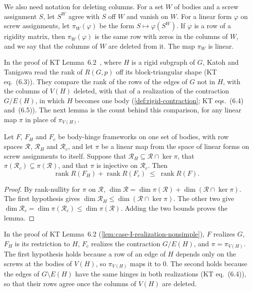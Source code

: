 We also need notation for deleting columns. For a set $W$ of bodies and
a screw assignment $S$, let $S^W$ agree with $S$ off $W$ and vanish on
$W$. For a linear form $\varphi$ on screw assignments, let
$\pi_W(\varphi)$ be the form $S \mapsto \varphi(S^W)$. If $\varphi$ is a
row of a rigidity matrix, then $\pi_W(\varphi)$ is the same row with
zeros in the columns of $W$, and we say that the columns of $W$ are
deleted from it. The map $\pi_W$ is linear.

In the proof of KT Lemma~6.2~\cite[pp.~673--674]{katohTanigawa2011},
where $H$ is a rigid subgraph of $G$, Katoh and Tanigawa read the rank
of $R(G,p)$ off its block-triangular shape (KT eq.~(6.3)). They compare
the rank of the rows of the edges of $G$ not in $H$, with the columns of
$V(H)$ deleted, with that of a realization of the contraction $G/E(H)$,
in which $H$ becomes one body (\cref{def:rigid-contraction}; KT
eqs.~(6.4) and~(6.5)). The next lemma is the count behind this
comparison, for any linear map $\pi$ in place of $\pi_{V(H)}$.

\begin{lemma}
  \label{lem:rigidityRows-splice-rank-add}
  \leanok
  Let $F$, $F_H$ and $F_c$ be body-hinge frameworks on one set of bodies,
  with row spaces $\mathcal R$, $\mathcal R_H$ and $\mathcal R_c$, and let
  $\pi$ be a linear map from the space of linear forms on screw
  assignments to itself. Suppose that
  $\mathcal R_H \subseteq \mathcal R \cap \ker \pi$, that
  $\pi(\mathcal R_c) \subseteq \pi(\mathcal R)$, and that $\pi$ is
  injective on $\mathcal R_c$. Then
  \[
    \operatorname{rank} R(F_H) + \operatorname{rank} R(F_c)
    \;\le\; \operatorname{rank} R(F).
  \]
\end{lemma}
\begin{proof}
  \leanok
  By rank-nullity for $\pi$ on $\mathcal R$,
  $\dim \mathcal R = \dim \pi(\mathcal R) + \dim(\mathcal R \cap \ker \pi)$.
  The first hypothesis gives
  $\dim \mathcal R_H \le \dim(\mathcal R \cap \ker \pi)$. The other two
  give $\dim \mathcal R_c = \dim \pi(\mathcal R_c) \le \dim \pi(\mathcal R)$.
  Adding the two bounds proves the lemma.
\end{proof}

In the proof of KT Lemma~6.2 (\cref{lem:case-I-realization-nonsimple}),
$F$ realizes $G$, $F_H$ is its restriction to $H$, $F_c$ realizes the
contraction $G/E(H)$, and $\pi = \pi_{V(H)}$. The first hypothesis holds
because a row of an edge of $H$ depends only on the screws at the bodies
of $V(H)$, so $\pi_{V(H)}$ maps it to $0$. The second holds
because the edges of $G \setminus E(H)$ have the same hinges in both
realizations (KT eq.~(6.4)), so that their rows agree once the columns
of $V(H)$ are deleted.

